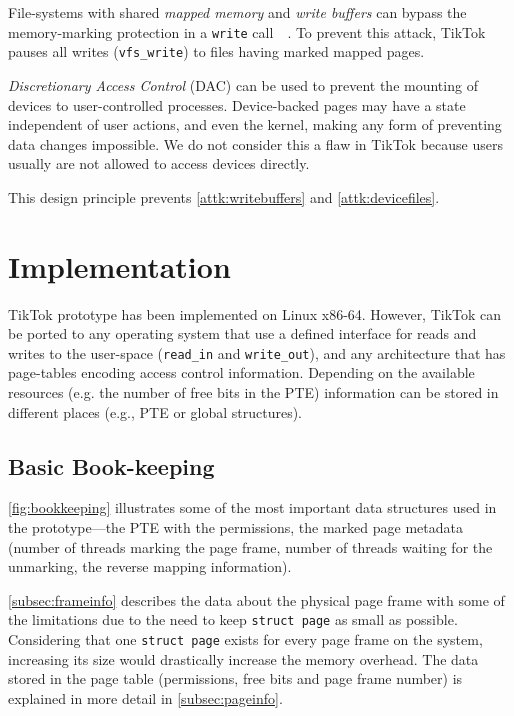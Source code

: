 \documentclass[conference]{IEEEtran}
\newcommand{\sysname}{TikTok}
\begin{document}
File-systems with shared
\emph{mapped memory} and \emph{write buffers} can bypass the memory-marking
protection in a \texttt{write} call~~\cite{watson2007exploiting}. To prevent
this attack, \sysname{} pauses
all writes (\texttt{vfs\_write}) to files having marked mapped pages.

\emph{Discretionary Access Control} (DAC) can be used to prevent the mounting of
devices to user-controlled processes. Device-backed pages may have a state
independent of user actions, and even the kernel, making any form of preventing
data changes impossible. We do not consider this a flaw in \sysname{} because
users usually are not allowed to access devices directly.

This design principle prevents \autoref{attk:writebuffers} and
\autoref{attk:devicefiles}.


\section{Implementation} \label{sec:implementation}

\sysname{} prototype has been implemented on Linux x86-64. However, \sysname{}
can be ported to any operating system that use a defined interface for reads and
writes to the user-space (\texttt{read\_in} and \texttt{write\_out}), and any
architecture that has page-tables encoding access control information. Depending
on the available resources (e.g. the number of free bits in the PTE) information
can be stored in different places (e.g., PTE or global structures).

\subsection{Basic Book-keeping}
\autoref{fig:bookkeeping} illustrates some of the most important data structures
used in the prototype---the PTE with the permissions, the marked page metadata
(number of threads marking the page frame, number of threads waiting for the
unmarking, the reverse mapping information). 

\autoref{subsec:frameinfo} describes the data about the physical page frame with
some of the limitations due to the need to keep \texttt{struct page} as small as
possible. Considering that one \texttt{struct page} exists for every page frame
on the system, increasing its size would drastically increase the memory
overhead.  The data stored in the page table (permissions, free bits and page
frame number) is explained in more detail in \autoref{subsec:pageinfo}.
\end{document}
